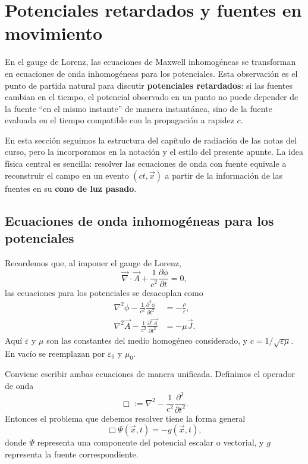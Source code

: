 \documentclass[../main.tex]{subfiles}
\begin{document}
\chapter{Potenciales retardados y fuentes en movimiento}
\label{sec:potenciales-retardados-fuentes-movimiento}

En el gauge de Lorenz, las ecuaciones de Maxwell inhomogéneas se transforman en ecuaciones de onda inhomogéneas para los potenciales. Esta observación es el punto de partida natural para discutir \textbf{potenciales retardados}: si las fuentes cambian en el tiempo, el potencial observado en un punto no puede depender de la fuente ``en el mismo instante'' de manera instantánea, sino de la fuente evaluada en el tiempo compatible con la propagación a rapidez $c$.

En esta sección seguimos la estructura del capítulo de radiación de las notas del curso, pero la incorporamos en la notación y el estilo del presente apunte. La idea física central es sencilla: resolver las ecuaciones de onda con fuente equivale a reconstruir el campo en un evento $(ct,\vec x)$ a partir de la información de las fuentes en su \textbf{cono de luz pasado}.

\section{Ecuaciones de onda inhomogéneas para los potenciales}
\label{subsec:onda-inhomogenea-potenciales}

Recordemos que, al imponer el gauge de Lorenz,
\begin{equation*}
    \vec\nabla\cdot\vec A+\frac{1}{c^2}\frac{\partial\phi}{\partial t}=0,
\end{equation*}
las ecuaciones para los potenciales se desacoplan como
\begin{align}
    \nabla^2\phi-\frac{1}{c^2}\frac{\partial^2\phi}{\partial t^2}
    &=-\frac{\rho}{\varepsilon},
    \label{eq:rad-onda-phi}\\
    \nabla^2\vec A-\frac{1}{c^2}\frac{\partial^2\vec A}{\partial t^2}
    &=-\mu\vec J.
    \label{eq:rad-onda-A}
\end{align}
Aquí $\varepsilon$ y $\mu$ son las constantes del medio homogéneo considerado, y $c=1/\sqrt{\varepsilon\mu}$. En vacío se reemplazan por $\varepsilon_0$ y $\mu_0$.

Conviene escribir ambas ecuaciones de manera unificada. Definimos el operador de onda
\begin{equation}
    \Box:=\nabla^2-\frac{1}{c^2}\frac{\partial^2}{\partial t^2}.
    \label{eq:rad-box-def}
\end{equation}
Entonces el problema que debemos resolver tiene la forma general
\begin{equation}
    \Box\Psi(\vec x,t)=-g(\vec x,t),
    \label{eq:rad-onda-inhomogenea-general}
\end{equation}
donde $\Psi$ representa una componente del potencial escalar o vectorial, y $g$ representa la fuente correspondiente.
\end{document}
